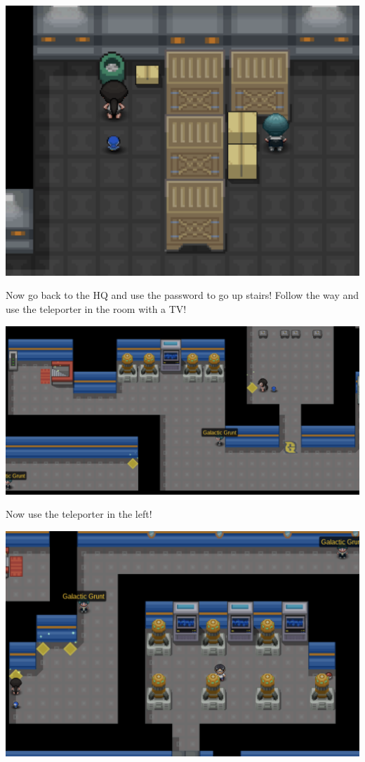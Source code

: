 \documentclass[11pt]{article}
\begin{document}
\includegraphics[width=\textwidth]{walkthrough/Sinnoh/galactic-2}

Now go back to the HQ and use the password to go up stairs!
Follow the way and use the teleporter in the room with a TV!

\includegraphics[width=\textwidth]{walkthrough/Sinnoh/galactic-3}

Now use the teleporter in the left!

\includegraphics[width=\textwidth]{walkthrough/Sinnoh/galactic-4}
\end{document}
